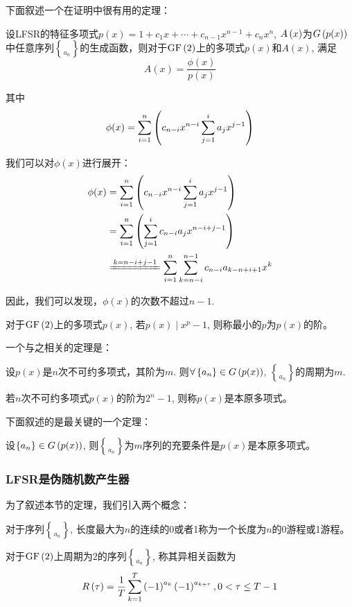 下面叙述一个在证明中很有用的定理：
\begin{theorem}
设LFSR的特征多项式$p(x)=1+c_1x+\cdots +c_{n-1}x^{n-1}+c_nx^n$, $A\left( {x}\right)$为$G\left( {p(x)}\right)$中任意序列$\brace{a_n}$的生成函数，则对于$\mathrm{GF}\left( {2}\right)$上的多项式$p(x)$和$A(x)$, 满足
\begin{equation}
    A(x)=\frac{\phi(x)}{p(x)}
\end{equation}

其中
\begin{equation}
    \phi(x)=\sum_{i=1}^n\left( {c_{n-i}x^{n-i}\sum_{j=1}^ia_jx^{j-1}}\right)
\end{equation}
\end{theorem}

我们可以对$\phi(x)$进行展开：
\begin{align*}
    \phi(x)&=\sum_{i=1}^n\pth{c_{n-i}x^{n-i}\sum_{j=1}^ia_jx^{j-1}}\\
    &=\sum_{i=1}^n\pth{\sum_{j=1}^ic_{n-i}a_jx^{n-i+j-1}}\\
    &\xlongequal{k=n-i+j-1}\sum_{i=1}^n\sum_{k=n-i}^{n-1}c_{n-i}a_{k-n+i+1}x^k
\end{align*}

因此，我们可以发现，$\phi(x)$的次数不超过$n-1$.
\begin{Definition}
对于$\mathrm{GF}\left( {2}\right)$上的多项式$p(x)$, 若$p(x)\mid x^p-1$, 则称最小的$p$为$p(x)$的阶。
\end{Definition}

一个与之相关的定理是：
\begin{theorem}
设$p(x)$是$n$次不可约多项式，其阶为$m$. 则$\forall \left\{ {a_n} \right\}\in G\left( {p(x)}\right)$, $\brace{a_n}$的周期为$m$.
\end{theorem}
\begin{Definition}
若$n$次不可约多项式$p(x)$的阶为$2^{n}-1$, 则称$p(x)$是本原多项式。
\end{Definition}

下面叙述的是最关键的一个定理：
\begin{theorem}
设$\left\{ {a_n} \right\}\in G\left( {p(x)}\right)$, 则$\brace{a_n}$为$m$序列的充要条件是$p(x)$是本原多项式。
\end{theorem}
\subsubsection{LFSR是伪随机数产生器}
为了叙述本节的定理，我们引入两个概念：
\begin{Definition}
对于序列$\brace{a_n}$, 长度最大为$n$的连续的0或者1称为一个长度为$n$的0游程或1游程。\par
对于$\mathrm{GF}\left( {2}\right)$上周期为$2$的序列$\brace{a_n}$, 称其异相关函数为
\begin{equation}
    R\left( {\tau}\right)=\frac{1}{T}\sum_{k=1}^T\left( {-1}\right)^{a_k}\left( {-1}\right)^{a_{k+\tau}}, 0<\tau\leq T-1
\end{equation}
\end{Definition}

